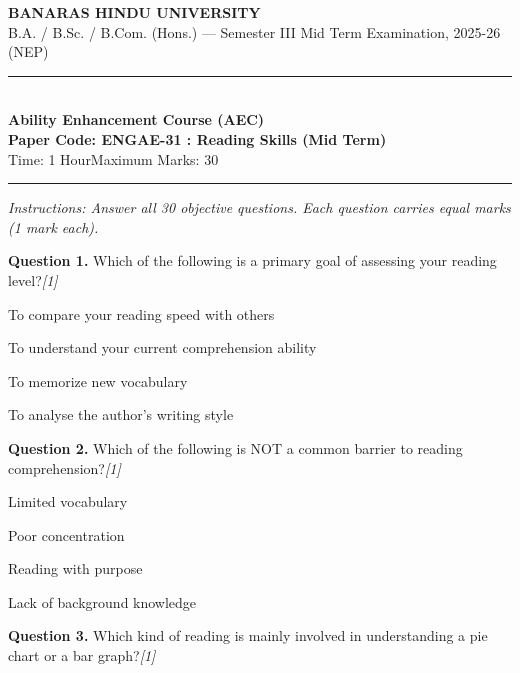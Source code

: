 \documentclass[11pt,a4paper]{article}
\newcommand{\pts}[1]{\hfill \textit{[#1]}}
\begin{document}
\begin{center}
  {\large\bfseries BANARAS HINDU UNIVERSITY}\\[2pt]
  {\normalsize B.A. / B.Sc. / B.Com. (Hons.) --- Semester III Mid Term Examination, 2025-26 (NEP)}\\[6pt]
  \rule{0.8\linewidth}{0.5pt}\\[6pt]
  {\large\bfseries Ability Enhancement Course (AEC)}\\[4pt]
  {\large\bfseries Paper Code: ENGAE-31 : Reading Skills (Mid Term)}\\[4pt]
  {\normalsize Time: 1 Hour\hfill Maximum Marks: 30}
\end{center}

\rule{\linewidth}{0.4pt}

\smallskip

\noindent \textit{Instructions: Answer all 30 objective questions. Each question carries equal marks (1 mark each).}

\bigskip




\noindent \textbf{Question 1.} Which of the following is a primary goal of assessing your reading level?\pts{1}

\begin{parts}
  \item To compare your reading speed with others
  \item To understand your current comprehension ability
  \item To memorize new vocabulary
  \item To analyse the author's writing style
\end{parts}

\medskip




\noindent \textbf{Question 2.} Which of the following is NOT a common barrier to reading comprehension?\pts{1}

\begin{parts}
  \item Limited vocabulary
  \item Poor concentration
  \item Reading with purpose
  \item Lack of background knowledge
\end{parts}

\medskip




\noindent \textbf{Question 3.} Which kind of reading is mainly involved in understanding a pie chart or a bar graph?\pts{1}
\end{document}
